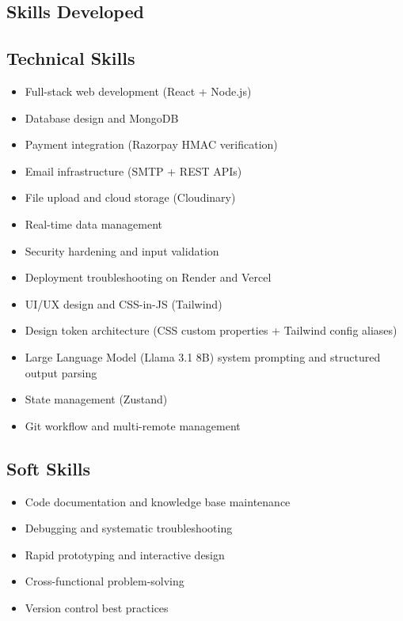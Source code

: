 \documentclass[11pt,a4paper]{article}
\begin{document}
\begin{itemize}
{%
\section{Skills Developed}

\subsection{Technical Skills}

\begin{itemize}
  \item Full-stack web development (React + Node.js)
  \item Database design and MongoDB
  \item Payment integration (Razorpay HMAC verification)
  \item Email infrastructure (SMTP + REST APIs)
  \item File upload and cloud storage (Cloudinary)
  \item Real-time data management
  \item Security hardening and input validation
  \item Deployment troubleshooting on Render and Vercel
  \item UI/UX design and CSS-in-JS (Tailwind)
  \item Design token architecture (CSS custom properties + Tailwind config aliases)
  \item Large Language Model (Llama 3.1 8B) system prompting and structured output parsing
  \item State management (Zustand)
  \item Git workflow and multi-remote management
\end{itemize}

\subsection{Soft Skills}

\begin{itemize}
  \item Code documentation and knowledge base maintenance
  \item Debugging and systematic troubleshooting
  \item Rapid prototyping and interactive design
  \item Cross-functional problem-solving
  \item Version control best practices
\end{itemize}

}
\end{itemize}
\end{document}

